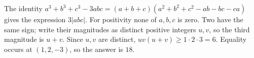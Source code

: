 The identity $a^3+b^3+c^3-3abc=(a+b+c)(a^2+b^2+c^2-ab-bc-ca)$ gives the expression $3|abc|$. For positivity none of $a,b,c$ is zero. Two have the same sign; write their magnitudes as distinct positive integers $u,v$, so the third magnitude is $u+v$. Since $u,v$ are distinct, $uv(u+v)\ge1\cdot2\cdot3=6$. Equality occurs at $(1,2,-3)$, so the answer is $\boxed{18}$.
